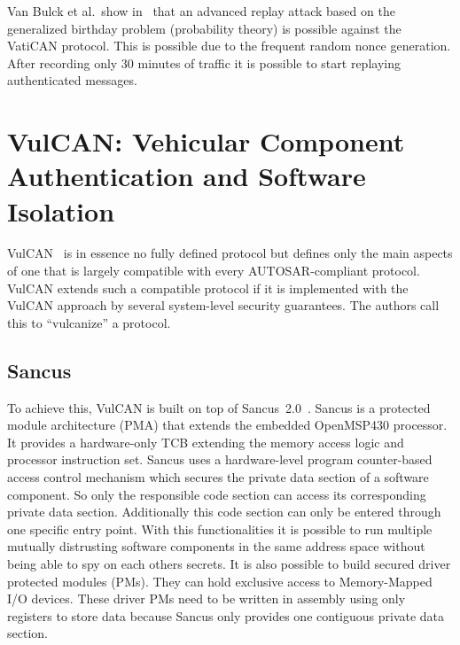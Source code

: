 Van Bulck et al.\ show in~\cite{VanBulck2017} that an advanced replay attack
based on the generalized birthday problem (probability theory) is possible
against the VatiCAN protocol. This is possible due to the frequent random nonce
generation. After recording only 30 minutes of traffic it is possible to start
replaying authenticated messages.


\section{VulCAN: Vehicular Component Authentication and Software Isolation}\label{sec:vulcan}

VulCAN~\cite{VanBulck2017} is in essence no fully defined protocol but defines
only the main aspects of one that is largely compatible with every
AUTOSAR-compliant protocol. VulCAN extends such a compatible protocol if it is
implemented with the VulCAN approach by several system-level security
guarantees. The authors call this to ``vulcanize'' a protocol.

\subsection{Sancus}\label{subsec:sancus}

To achieve this, VulCAN is built on top of Sancus~2.0~\cite{Noorman}. Sancus is
a protected module architecture (PMA) that extends the embedded OpenMSP430
processor. It provides a hardware-only TCB extending the memory access logic and
processor instruction set. Sancus uses a hardware-level program counter-based
access control mechanism which secures the private data section of a software
component. So only the responsible code section can access its corresponding
private data section. Additionally this code section can only be entered through
one specific entry point. With this functionalities it is possible to run
multiple mutually distrusting software components in the same address space
without being able to spy on each others secrets. It is also possible to build
secured driver protected modules (PMs). They can hold exclusive access to
Memory-Mapped I/O devices. These driver PMs need to be written in assembly using
only registers to store data because Sancus only provides one contiguous private
data section. 

